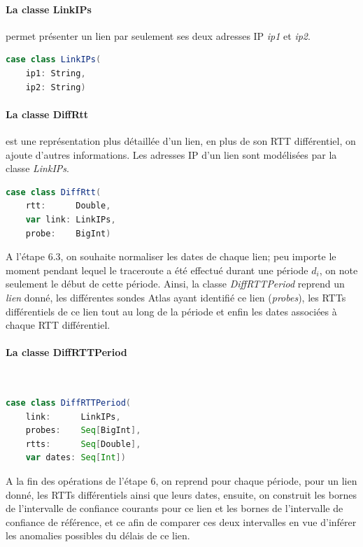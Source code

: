 \paragraph{La classe LinkIPs} permet présenter un lien par seulement ses deux adresses IP \textit{ip1} et \textit{ip2}.
\begin{lstlisting}[language=scala]
case class LinkIPs(
	ip1: String,
	ip2: String)
\end{lstlisting}

\paragraph{La classe DiffRtt} est une représentation plus détaillée d'un lien, en plus de son RTT différentiel, on ajoute d'autres informations.  Les adresses IP d'un lien sont modélisées par la classe \textit{LinkIPs}.

\begin{lstlisting}[language=scala]
case class DiffRtt(
	rtt:      Double,
	var link: LinkIPs,
	probe:    BigInt)
\end{lstlisting}

A l'étape 6.3, on souhaite normaliser les dates de chaque lien; peu importe le moment pendant lequel le traceroute a été effectué durant une période $d_i$, on note seulement le début de cette période. Ainsi,  la classe  \textit{DiffRTTPeriod}  reprend un \textit{lien} donné, les différentes sondes Atlas ayant identifié ce lien (\textit{probes}), les RTTs différentiels de ce lien tout au long de la période et enfin les dates associées à chaque RTT différentiel.
\paragraph{La classe DiffRTTPeriod } ~
\begin{lstlisting}[language=scala]
case class DiffRTTPeriod(
	link:      LinkIPs,
	probes:    Seq[BigInt],
	rtts:      Seq[Double],
	var dates: Seq[Int])
\end{lstlisting}

A la fin des opérations de l'étape 6, on reprend pour chaque période, pour un lien donné, les RTTs différentiels ainsi que leurs dates, ensuite, on construit les bornes de l'intervalle de confiance courants pour ce lien et les bornes de l'intervalle de confiance de référence, et ce afin de comparer ces deux intervalles en vue d'inférer les anomalies possibles du délais de ce lien.


